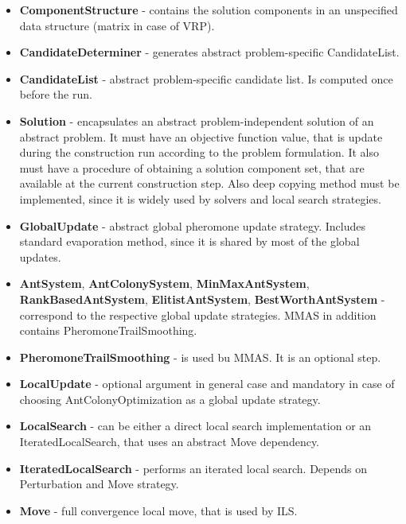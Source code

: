 \documentclass[11pt,a4paper,oneside]{book}
\begin{document}
\begin{itemize}
\item \textbf{ComponentStructure} - contains the solution components in an unspecified data structure (matrix in case of VRP).

\item \textbf{CandidateDeterminer} - generates abstract problem-specific CandidateList.

\item \textbf{CandidateList} - abstract problem-specific candidate list. Is computed once before the run.

\item \textbf{Solution} - encapsulates an abstract problem-independent solution of an abstract problem. It must have an objective function value, that is update during the construction run according to the problem formulation. It also must have a procedure of obtaining a solution component set, that are available at the current construction step. Also deep copying method must be implemented, since it is widely used by solvers and local search strategies.

\item \textbf{GlobalUpdate} - abstract global pheromone update strategy. Includes standard evaporation method, since it is shared by most of the global updates.

\item \textbf{AntSystem}, \textbf{AntColonySystem}, \textbf{MinMaxAntSystem}, \textbf{RankBasedAntSystem}, \textbf{ElitistAntSystem}, \textbf{BestWorthAntSystem} - correspond to the respective global update strategies. MMAS in addition contains PheromoneTrailSmoothing.

\item \textbf{PheromoneTrailSmoothing} - is used bu MMAS. It is an optional step.

\item \textbf{LocalUpdate} - optional argument in general case and mandatory in case of choosing AntColonyOptimization as a global update strategy.

\item \textbf{LocalSearch} - can be either a direct local search implementation or an IteratedLocalSearch, that uses an abstract Move dependency.

\item \textbf{IteratedLocalSearch} - performs an iterated local search. Depends on Perturbation and Move strategy.

\item \textbf{Move} - full convergence local move, that is used by ILS.


\end{itemize}
\end{document}
